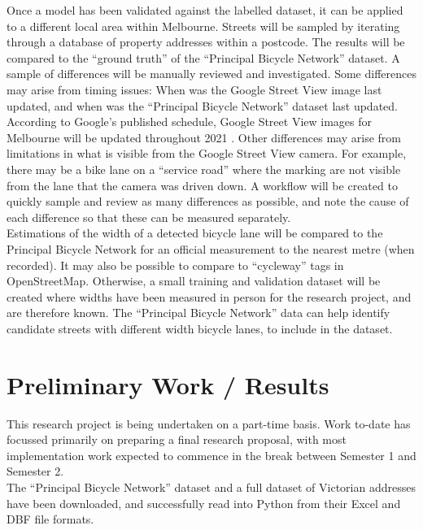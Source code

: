 \documentclass{article}
\begin{document}
Once a model has been validated against the labelled dataset, it can be applied to a different local area within Melbourne.  Streets will be sampled by iterating through a database of property addresses within a postcode.  The results will be compared to the ``ground truth'' of the ``Principal Bicycle Network'' dataset.  A sample of differences will be manually reviewed and investigated.  Some differences may arise from timing issues:  When was the Google Street View image last updated, and when was the ``Principal Bicycle Network'' dataset last updated.  According to Google's published schedule, Google Street View images for Melbourne will be updated throughout 2021 \cite{googleschedule}.  Other differences may arise from limitations in what is visible from the Google Street View camera.  For example, there may be a bike lane on a ``service road'' where the marking are not visible from the lane that the camera was driven down.  A workflow will be created to quickly  sample and review as many differences as possible, and note the cause of each difference so that these can be measured separately.
\\

Estimations of the width of a detected bicycle lane will be compared to the Principal Bicycle Network for an official measurement to the nearest metre (when recorded).  It may also be possible to compare to ``cycleway'' tags in OpenStreetMap.  Otherwise, a small training and validation dataset will be created where widths have been measured in person for the research project, and are therefore known.  The ``Principal Bicycle Network'' data can help identify candidate streets with different width bicycle lanes, to include in the dataset.

\section{Preliminary Work / Results}

This research project is being undertaken on a part-time basis.  Work to-date has focussed primarily on preparing a final research proposal, with most implementation work expected to commence in the break between Semester 1 and Semester 2. \\

The ``Principal Bicycle Network'' dataset \cite{PrincipalBicycleNetwork} and a full dataset of Victorian addresses \cite{vicmap} have been downloaded, and successfully read into Python from their Excel and DBF file formats. \\
\end{document}
